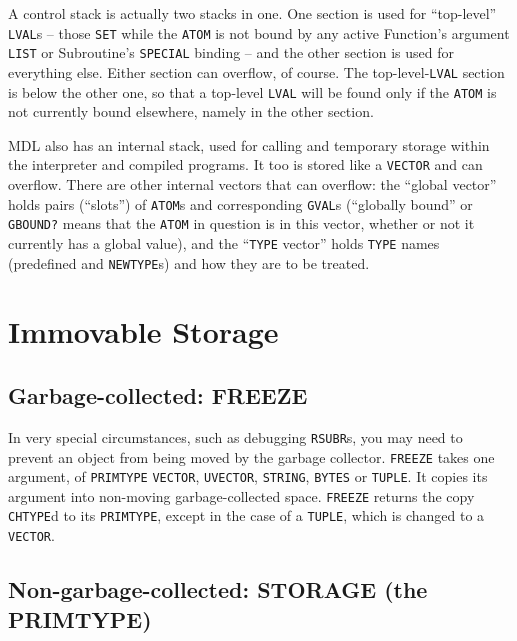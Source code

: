 \documentclass[a4paper]{scrbook}
\begin{document}
A control stack is actually two stacks in one. One section is used for ``top-level'' \texttt{LVAL}s -- those \texttt{SET}
while the \texttt{ATOM} is not bound by any active Function's argument \texttt{LIST} or Subroutine's
\texttt{SPECIAL} binding -- and the other section is used for everything else. Either section can
overflow, of course. The top-level-\texttt{LVAL} section is below the other one, so that a top-level \texttt{LVAL} will be
found only if the \texttt{ATOM} is not currently bound elsewhere, namely in the other section.

MDL also has an internal stack, used for calling and temporary storage within the interpreter and compiled programs. It too
is stored like a \texttt{VECTOR} and can overflow. There are other internal vectors that can overflow: the ``global
vector'' holds pairs (``slots'') of \texttt{ATOM}s and corresponding \texttt{GVAL}s (``globally
bound'' or \texttt{GBOUND?} means that the \texttt{ATOM} in question is in this vector, whether or
not it currently has a global value), and the ``\texttt{TYPE} vector'' holds \texttt{TYPE} names (predefined and
\texttt{NEWTYPE}s) and how they are to be treated.

\section{Immovable Storage}\label{immovable-storage}

\subsection{Garbage-collected: FREEZE}\label{garbage-collected-freeze}

In very special circumstances, such as debugging \texttt{RSUBR}s, you may need to prevent an object from being moved by the
garbage collector. \texttt{FREEZE} takes one argument, of \texttt{PRIMTYPE} \texttt{VECTOR},
\texttt{UVECTOR}, \texttt{STRING}, \texttt{BYTES} or \texttt{TUPLE}. It copies its argument into non-moving
garbage-collected space. \texttt{FREEZE} returns the copy \texttt{CHTYPE}d to its \texttt{PRIMTYPE}, except in the case of
a \texttt{TUPLE}, which is changed to a \texttt{VECTOR}.

\subsection{Non-garbage-collected: STORAGE (the PRIMTYPE)}\label{non-garbage-collected-storage-the-primtype}
\end{document}
